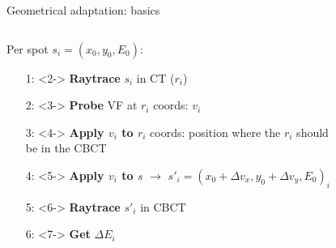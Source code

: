 \begin{frame}[c]{Geometrical adaptation: basics}
	\begin{columns}[t]
		\begin{column}{0.55\textwidth}
            Per spot $s_i = (x_0, y_0, E_0)$:
            \begin{itemize}
                \item[1:]<2-> \textbf{Raytrace} $s_i$ in CT ($r_i$)
                \item[2:]<3-> \textbf{Probe} VF at $r_i$ coords: $v_i$
                \item[3:]<4-> \textbf{Apply $v_i$ to $r_i$} coords: position where the $r_i$ should be in the CBCT
                \item[4:]<5-> \textbf{Apply $v_i$ to $s$} $\rightarrow $ $s'_i = (x_0 + \Delta v_x, y_0 + \Delta v_y, E_0)_i$
                \item[5:]<6-> \textbf{Raytrace} $s'_i$ in CBCT
                \item[6:]<7-> \textbf{Get} $\Delta E_i$
            \end{itemize}
		\end{column}
		\begin{column}{0.45\textwidth}
			\vspace{-1cm}
			\begin{figure}

\end{figure}
\end{column}
\end{columns}
\end{frame}

